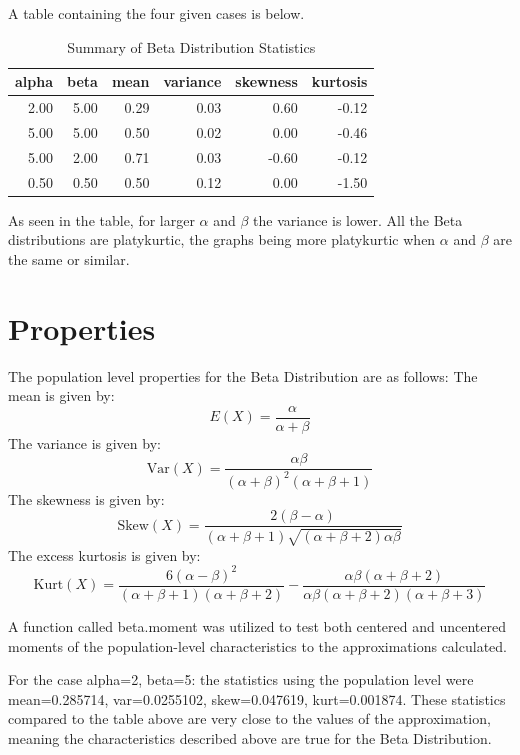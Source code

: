 \documentclass{article}\usepackage[]{graphicx}\usepackage[]{xcolor}
\begin{document}
\begin{multicols}{2}
A table containing the four given cases is below.


\begin{table}[H]
\centering
\begingroup\small
\begin{tabular}{rrrrrr}
  \hline
alpha & beta & mean & variance & skewness & kurtosis \\ 
  \hline
2.00 & 5.00 & 0.29 & 0.03 & 0.60 & -0.12 \\ 
  5.00 & 5.00 & 0.50 & 0.02 & 0.00 & -0.46 \\ 
  5.00 & 2.00 & 0.71 & 0.03 & -0.60 & -0.12 \\ 
  0.50 & 0.50 & 0.50 & 0.12 & 0.00 & -1.50 \\ 
   \hline
\end{tabular}
\endgroup
\caption{Summary of Beta Distribution Statistics} 
\end{table}

As seen in the table, for larger \(\alpha\) and \(\beta\) the variance is lower. All the Beta distributions are platykurtic, the graphs being more platykurtic when \(\alpha\) and \(\beta\) are the same or similar. 

\section{Properties}
The population level properties for the Beta Distribution are as follows:
The mean is given by:
\[
E(X) = \frac{\alpha}{\alpha + \beta}
\]
The variance is given by:
\[
\text{Var}(X) = \frac{\alpha \beta}{(\alpha + \beta)^2 (\alpha + \beta + 1)}
\]
The skewness is given by:
\[
\text{Skew}(X) = \frac{2(\beta - \alpha)}{(\alpha + \beta + 1)\sqrt{(\alpha + \beta + 2)\alpha \beta}}
\]
The excess kurtosis is given by:
\[
\text{Kurt}(X) = \frac{6(\alpha - \beta)^2}{(\alpha + \beta + 1)\left(\alpha + \beta + 2\right)} - \frac{\alpha \beta (\alpha + \beta + 2)}{\alpha \beta (\alpha + \beta + 2)(\alpha + \beta + 3)}
\]

A function called beta.moment was utilized to test both centered and uncentered moments of the population-level characteristics to the approximations calculated. 

For the case alpha=2, beta=5: the statistics using the population level were mean=0.285714, var=0.0255102, skew=0.047619, kurt=0.001874.
These statistics compared to the table above are very close to the values of the approximation, meaning the characteristics described above are true for the Beta Distribution.


\end{multicols}
\end{document}
